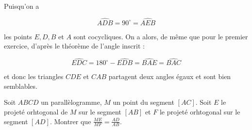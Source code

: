 \begin{sol}
\begin{center}
\end{center}

Puisqu'on a

\[\widehat{ADB}=90^\circ=\widehat{AEB}\]

les points $E,D,B$ et $A$ sont cocycliques. On a alors, de même que pour le premier exercice, d'après le théorème de l'angle inscrit :

\[\widehat{EDC}=180^\circ-\widehat{EDB}=\widehat{BAE}=\widehat{BAC}\]

et donc les triangles $CDE$ et $CAB$ partagent deux angles égaux et sont bien semblables.
\end{sol}

\begin{exo}
Soit $ABCD$ un parallèlogramme, $M$ un point du segment $[AC]$. Soit $E$ le projeté orhtogonal de $M$ sur le segment $[AB]$ et $F$ le projeté orhtogonal sur le segment $[AD]$. Montrer que $\frac{ME}{MF}=\frac{AD}{AB}$.
\end{exo}

